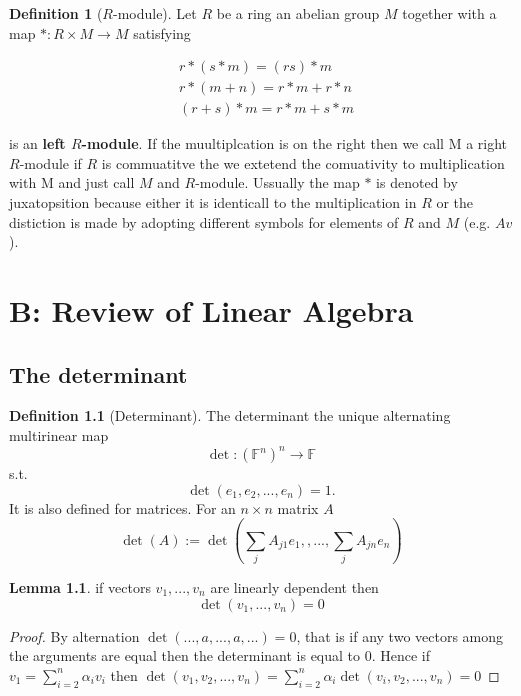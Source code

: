 \documentclass{tufte-book} %
\theoremstyle{definition}
\newtheorem{definition}{Definition}
\theoremstyle{theorem}
\theoremstyle{proposition}
\theoremstyle{lemma}
\newtheorem{lemma}{Lemma}
\theoremstyle{corolarry}
\begin{document}
\begin{definition}[$R$-module]
  Let $R$ be a ring an abelian group $M$ together with a map $*:R \times M \to M$ satisfying
  
  \begin{align}
    &r*(s*m) = (rs)*m \\
    &r*(m+n) = r*m+r*n \\
    &(r+s)*m = r*m+s*m
  \end{align}


is an \textbf{left $R$-module}. If the muultiplcation is on the right then we call M a right $R$-module if $R$ is commuatitve the we extetend the comuativity to multiplication with M and just call $M$ and $R$-module. Ussually the map $*$ is denoted by juxatopsition because either it is identicall to the multiplication in $R$ or the distiction is made by adopting different symbols for elements of $R$ and $M$ (e.g. $Av$). 
  
\end{definition}

\chapter{B: Review of Linear Algebra}


\section{The determinant}

\begin{definition}[Determinant]
  The determinant the unique alternating multirinear map $$ \det: (\mathbb{F}^n)^n \to \mathbb{F}$$ s.t. $$ \det(e_1,e_2,...,e_n) = 1.$$
  It is also defined for matrices. For an $n \times n$ matrix $A$  $$\det(A) := \det(\sum_j A_{j1} e_1,,...,\sum_j A_{jn}e_n)$$
  
\end{definition}

\begin{lemma} if vectors $v_1,...,v_n$ are linearly dependent  then $$\det(v_1,...,v_n) = 0$$
  
\end{lemma}

\begin{proof}
  By alternation $\det(...,a,...,a,...) = 0$, that is if any two vectors among the arguments are equal then the determinant is equal to $0$. Hence if $v_1 = \sum_{i = 2}^n \alpha_i v_i$ then $\det(v_1,v_2,...,v_n) = \sum_{i=2}^n \alpha_{i} \det(v_i,v_2,...,v_n) = 0$
  
\end{proof}
\end{document}
